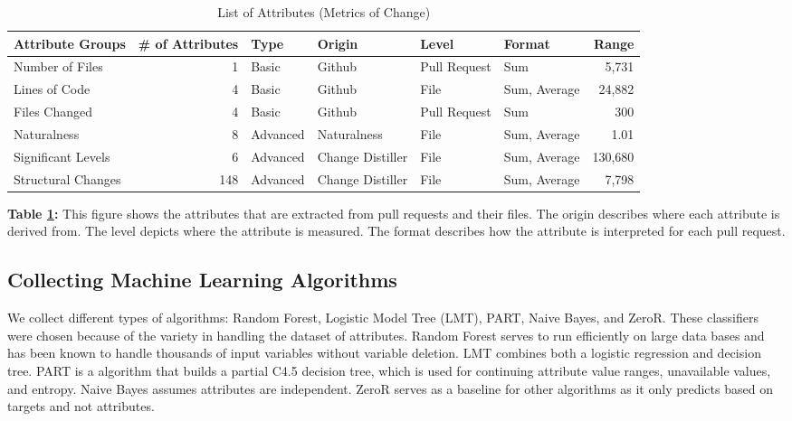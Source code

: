 \documentclass[10pt, conference]{IEEEtran}
\begin{document}
\begin{table}[t]
  \centering
  \caption{List of Attributes (Metrics of Change)}
  \label{figureListOfMetrics}
  \begin{tabular}{l|rllllr}
    \toprule
    \textbf{Attribute Groups} & \textbf{\# of Attributes} & \textbf{Type}& \textbf{Origin} & \textbf{Level} & \textbf{Format} & \textbf{Range}\\ %
    \midrule
    Number of Files & 1 & Basic & Github & Pull Request & Sum & 5,731 \\ %
    Lines of Code & 4 & Basic & Github & File & Sum, Average & 24,882 \\ %
    Files Changed & 4 & Basic & Github & Pull Request & Sum & 300 \\ %
    Naturalness & 8 & Advanced & Naturalness & File & Sum, Average & 1.01\\ %
    Significant Levels & 6 & Advanced & Change Distiller & File & Sum, Average &130,680 \\ %
     Structural Changes & 148 & Advanced & Change Distiller & File & Sum, Average & 7,798 \\ %
    \bottomrule
  \end{tabular}
  \break
  \newline
\textbf{Table \ref{figureListOfMetrics}:} This figure shows the attributes that are extracted from pull requests and their files. The origin describes where each attribute is derived from. The level depicts where the attribute is measured. The format describes how the attribute is interpreted for each pull request.
\end{table}

\subsection{Collecting Machine Learning Algorithms}
We collect different types of algorithms: Random Forest, Logistic Model Tree (LMT), PART, Naive Bayes, and ZeroR. These classifiers were chosen because of the variety in handling the dataset of attributes. Random Forest serves to run efficiently on large data bases and has been known to handle thousands of input variables without variable deletion. LMT combines both a logistic regression and decision tree. PART is a algorithm that builds a partial C4.5 decision tree, which is used for continuing attribute value ranges, unavailable values, and entropy. Naive Bayes assumes attributes are independent. ZeroR serves as a baseline for other algorithms as it only predicts based on targets and not attributes.
\end{document}

